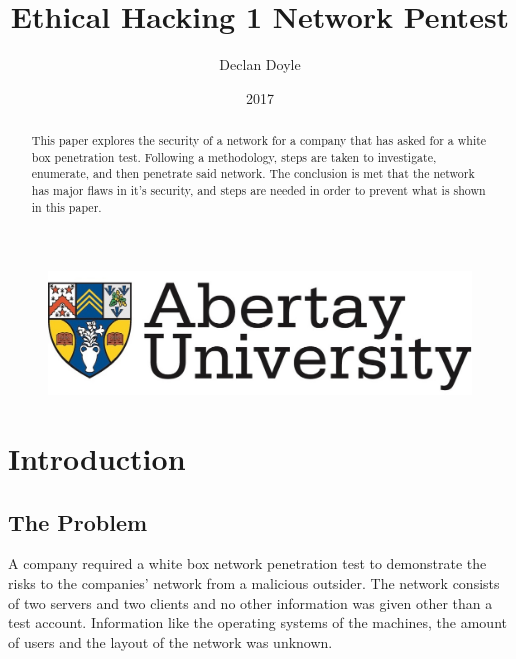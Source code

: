 \documentclass[12pt,a4paper]{article}
\title{Ethical Hacking 1 Network Pentest}
\author{Declan Doyle}
\affil{BSc Ethical Hacking\\
		Abertay University\\
		Dundee, United Kingdom\\
		1600219@abertay.ac.uk}
\date{2017}
\begin{document}

	\begin{figure}
		\includegraphics[width=\linewidth]{img/unilogo}
	\end{figure}

	\maketitle

	\newpage
		\begin{abstract}
			This paper explores the security of a network for a company that has asked for a white box penetration test. Following a methodology, steps are taken to investigate, enumerate, and then penetrate said network. The conclusion is met that the network has major flaws in it's security, and steps are needed in order to prevent what is shown in this paper.
		\end{abstract}

	\newpage
	\tableofcontents
	\newpage



	\section{Introduction}
		\subsection{The Problem}
		A company required a white box network penetration test to demonstrate the risks to the companies' network from a malicious outsider. The network consists of two servers and two clients and no other information was given other than a test account. Information like the operating systems of the machines, the amount of users and the layout of the network was unknown.
\end{document}
